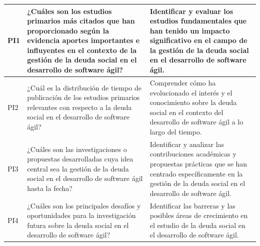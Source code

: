 \begin{longtable}[H]{|
    >{\Centering\hspace{0pt}}p{0.7cm}|     %
    >{\RaggedRight\hspace{0pt}}p{8.0cm}|   %
    >{\RaggedRight\hspace{0pt}}p{6.5cm}|   %
    }
    PI1                                                                                                                                                                                                          &
    ¿Cuáles son los estudios primarios más citados que han proporcionado según la evidencia aportes importantes e influyentes en el contexto de la gestión de la deuda social en el desarrollo de software ágil? &
    Identificar y evaluar los estudios fundamentales que han tenido un impacto significativo en el campo de la gestión de la deuda social en el desarrollo de software ágil.                                                                                                \\
    \hline

    PI2                                                                                                                                                                                                          &
    ¿Cuál es la distribución de tiempo de publicación de los estudios primarios relevantes con respecto a la deuda social en el desarrollo de software ágil?                                                     &
    Comprender cómo ha evolucionado el interés y el conocimiento sobre la deuda social en el contexto del desarrollo de software ágil a lo largo del tiempo.                                                                                                                \\
    \hline

    PI3                                                                                                                                                                                                          &
    ¿Cuáles son las investigaciones o propuestas desarrolladas cuya idea central sea la gestión de la deuda social en el desarrollo de software ágil hasta la fecha?                                             &
    Identificar y analizar las contribuciones académicas y propuestas prácticas que se han centrado específicamente en la gestión de la deuda social en el desarrollo de software ágil.                                                                                     \\
    \hline

    PI4                                                                                                                                                                                                          &
    ¿Cuáles son los principales desafíos y oportunidades para la investigación futura sobre la deuda social en el desarrollo de software ágil?                                                                   &
    Identificar las barreras y las posibles áreas de crecimiento en el estudio de la deuda social en el desarrollo de software ágil.                                                                                                                                        \\
    \hline


\end{longtable}
